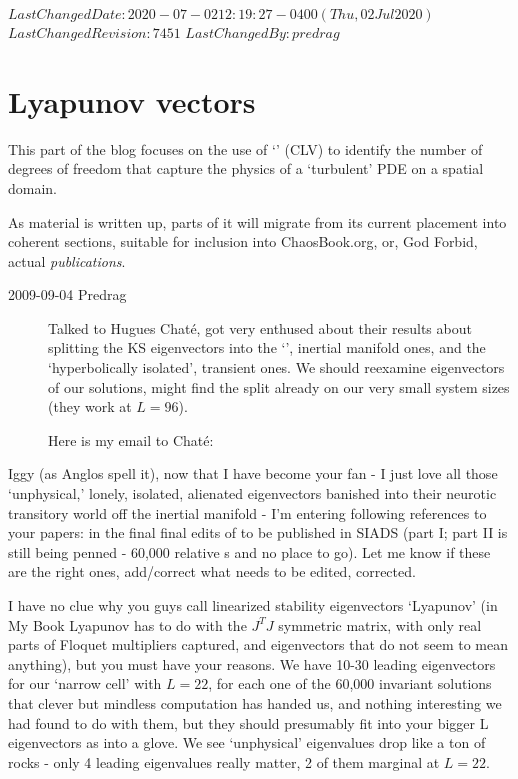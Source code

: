 \ifsvnmulti
 {$LastChangedDate: 2020-07-02 12:19:27 -0400 (Thu, 02 Jul 2020) $}
 {$LastChangedRevision: 7451 $} {$LastChangedBy: predrag $}
\fi

\chapter{Lyapunov vectors}
\label{s:LyapunovVec}

This part of the blog focuses on the use of `{\cLvs}' (CLV) to identify the
number of degrees of freedom that capture the physics of a `turbulent' PDE on
a spatial domain.

As material is written up, parts of it will migrate from its
current placement into coherent sections, suitable for
inclusion into ChaosBook.org, or, God Forbid, actual {\em
publications}.

\begin{description}

\item[2009-09-04 Predrag]
Talked to  Hugues Chat\'{e}, got very
enthused about their results about splitting the KS
eigenvectors into the `{\entangled}', inertial manifold ones,
and the `hyperbolically isolated', transient ones. We should
reexamine eigenvectors of our solutions, might find the split
already on our very small system sizes (they work at $L=96$).

Here is my email to Chat\'{e}:

\end{description}

Iggy (as Anglos spell it),
%
now that I have become your fan - I just love all those `unphysical,'
lonely, isolated, alienated eigenvectors banished into their neurotic
transitory world off the inertial manifold -  I'm entering following
references to your papers:
in the final final edits of to be published in SIADS (part I;
part II is still being penned - 60,000 relative {\po s} and no
place to go). Let me know if these are the right ones, add/correct what
needs to be edited, corrected.

I have no clue why you guys call linearized stability
eigenvectors `Lyapunov' (in My Book Lyapunov has to do with
the $J^T J$ symmetric matrix, with only real parts of Floquet
multipliers captured, and eigenvectors that do not seem to
mean anything), but you must have your reasons. We have 10-30
leading eigenvectors for our `narrow cell' with $L=22$, for
each one of the 60,000 invariant solutions that clever but
mindless computation has handed us, and nothing interesting
we had found to do with them, but they should presumably fit
into your bigger L eigenvectors as into a glove. We see
`unphysical' eigenvalues drop like a ton of rocks - only 4
leading eigenvalues really matter, 2 of them marginal at
$L=22$.

